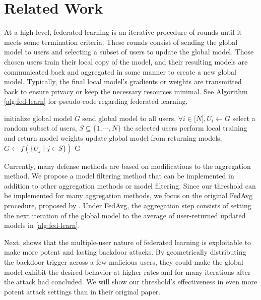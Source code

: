 \documentclass{article} %
\begin{document}
%
\section{Related Work}

At a high level, federated learning is an iterative procedure of rounds until it meets some termination criteria. These rounds consist of sending the global model to users and selecting a subset of users to update the global model. Those chosen users train their local copy of the model, and their resulting models are communicated back and aggregated in some manner to create a new global model. Typically, the final local model's gradients or weights are transmitted back to ensure privacy or keep the necessary resources minimal. See Algorithm \ref{alg:fed-learn} for pseudo-code regarding federated learning.


\begin{algorithm}
\caption{}
\label{alg:fed-learn}
\begin{algorithmic}
    \State initialize global model $G$
        \State send global model to all users, $\forall i \in \mathopen[ N \mathclose], U_i \gets G$
        \State select a random subset of users, $S \subseteq \{1, \cdots, N\}$
        \State the selected users perform local training and return model weights
        \State update global model from returning models, $G \gets f(\{U_j \mid j \in S\})$
    \EndFor
    \State \Return G
    \EndProcedure
\end{algorithmic}
\end{algorithm}

Currently, many defense methods are based on modifications to the aggregation method. We propose a model filtering method that can be implemented in addition to other aggregation methods or model filtering. Since our threshold can be implemented for many aggregation methods, we focus on the original FedAvg procedure, proposed by \cite{fedavg}. Under FedAvg, the aggregation step consists of setting the next iteration of the global model to the average of user-returned updated models in \ref{alg:fed-learn}. 

Next, \cite{dba} shows that the multiple-user nature of federated learning is exploitable to make more potent and lasting backdoor attacks. By geometrically distributing the backdoor trigger across a few malicious users, they could make the global model exhibit the desired behavior at higher rates and for many iterations after the attack had concluded. We will show our threshold's effectiveness in even more potent attack settings than in their original paper.
\end{document}
